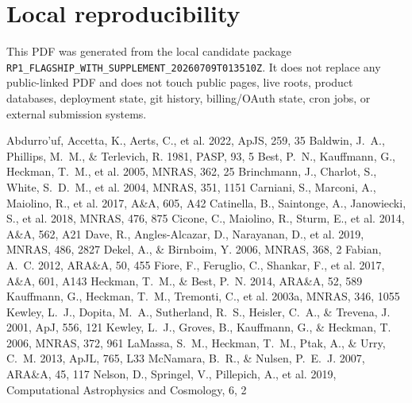 \documentclass[twocolumn]{aastex631}
\begin{document}
\section{Local reproducibility}
This PDF was generated from the local candidate package \texttt{RP1\_FLAGSHIP\_WITH\_SUPPLEMENT\_20260709T013510Z}. It does not replace any public-linked PDF and does not touch public pages, live roots, product databases, deployment state, git history, billing/OAuth state, cron jobs, or external submission systems.


\begin{thebibliography}{}
 Abdurro'uf, Accetta, K., Aerts, C., et al. 2022, ApJS, 259, 35
 Baldwin, J.~A., Phillips, M.~M., \& Terlevich, R. 1981, PASP, 93, 5
 Best, P.~N., Kauffmann, G., Heckman, T.~M., et al. 2005, MNRAS, 362, 25
 Brinchmann, J., Charlot, S., White, S.~D.~M., et al. 2004, MNRAS, 351, 1151
 Carniani, S., Marconi, A., Maiolino, R., et al. 2017, A\&A, 605, A42
 Catinella, B., Saintonge, A., Janowiecki, S., et al. 2018, MNRAS, 476, 875
 Cicone, C., Maiolino, R., Sturm, E., et al. 2014, A\&A, 562, A21
 Dave, R., Angles-Alcazar, D., Narayanan, D., et al. 2019, MNRAS, 486, 2827
 Dekel, A., \& Birnboim, Y. 2006, MNRAS, 368, 2
 Fabian, A.~C. 2012, ARA\&A, 50, 455
 Fiore, F., Feruglio, C., Shankar, F., et al. 2017, A\&A, 601, A143
 Heckman, T.~M., \& Best, P.~N. 2014, ARA\&A, 52, 589
 Kauffmann, G., Heckman, T.~M., Tremonti, C., et al. 2003a, MNRAS, 346, 1055
 Kewley, L.~J., Dopita, M.~A., Sutherland, R.~S., Heisler, C.~A., \& Trevena, J. 2001, ApJ, 556, 121
 Kewley, L.~J., Groves, B., Kauffmann, G., \& Heckman, T. 2006, MNRAS, 372, 961
 LaMassa, S.~M., Heckman, T.~M., Ptak, A., \& Urry, C.~M. 2013, ApJL, 765, L33
 McNamara, B.~R., \& Nulsen, P.~E.~J. 2007, ARA\&A, 45, 117
 Nelson, D., Springel, V., Pillepich, A., et al. 2019, Computational Astrophysics and Cosmology, 6, 2

\end{thebibliography}
\end{document}

